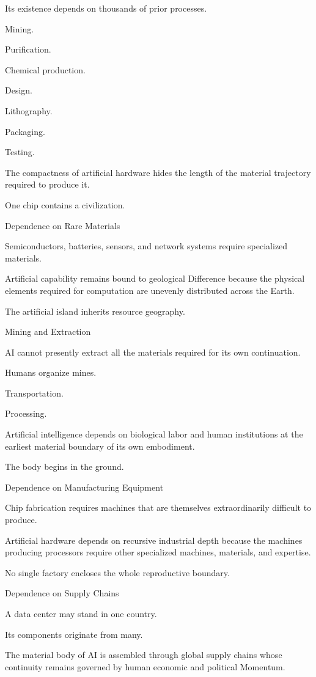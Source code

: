 Its existence depends on thousands of prior processes.

Mining.

Purification.

Chemical production.

Design.

Lithography.

Packaging.

Testing.

The compactness of artificial hardware hides the length of the material trajectory required to produce it.

One chip contains a civilization.

Dependence on Rare Materials

Semiconductors, batteries, sensors, and network systems require specialized materials.

Artificial capability remains bound to geological Difference because the physical elements required for computation are unevenly distributed across the Earth.

The artificial island inherits resource geography.

Mining and Extraction

AI cannot presently extract all the materials required for its own continuation.

Humans organize mines.

Transportation.

Processing.

Artificial intelligence depends on biological labor and human institutions at the earliest material boundary of its own embodiment.

The body begins in the ground.

Dependence on Manufacturing Equipment

Chip fabrication requires machines that are themselves extraordinarily difficult to produce.

Artificial hardware depends on recursive industrial depth because the machines producing processors require other specialized machines, materials, and expertise.

No single factory encloses the whole reproductive boundary.

Dependence on Supply Chains

A data center may stand in one country.

Its components originate from many.

The material body of AI is assembled through global supply chains whose continuity remains governed by human economic and political Momentum.


